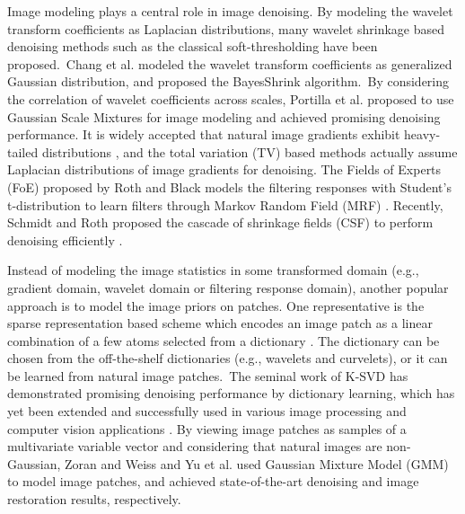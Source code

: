 Image modeling plays a central role in image denoising. By modeling the wavelet transform coefficients as Laplacian distributions, many wavelet shrinkage based denoising methods such as the classical soft-thresholding \cite{softthresholding} have been proposed.\ Chang et al. modeled the wavelet transform coefficients as generalized Gaussian distribution, and proposed the BayesShrink \cite{bayesshrink} algorithm.\ By considering the correlation of wavelet coefficients across scales, Portilla et al.  \cite{blsgsm} proposed to use Gaussian Scale Mixtures for image modeling and achieved promising denoising performance. It is widely accepted that natural image gradients exhibit heavy-tailed distributions \cite{weiss}, and the total variation (TV) based methods \cite{rudin1992nonlinear,osher2005iterative} actually assume Laplacian distributions of image gradients for denoising. The Fields of Experts (FoE) \cite{foe} proposed by Roth and Black models the filtering responses with Student's t-distribution to learn filters through Markov Random Field (MRF) \cite{Bishop}. Recently, Schmidt and Roth proposed the cascade of shrinkage fields (CSF) to perform denoising efficiently \cite{csf}.

Instead of modeling the image statistics in some transformed domain (e.g., gradient domain, wavelet domain or filtering response domain), another popular approach is to model the image priors on patches. One representative is the sparse representation based scheme which encodes an image patch as a linear combination of a few atoms selected from a dictionary \cite{olshausen1996emergence,olshausen1997sparse,ksvd}. The dictionary can be chosen from the off-the-shelf dictionaries (e.g., wavelets and curvelets), or it can be learned from natural image patches.\ The seminal work of K-SVD \cite{ksvdtsp,ksvd} has demonstrated promising denoising performance by dictionary learning, which has yet been extended and successfully used in various image processing and computer vision applications \cite{srcolor,srcvpr,lcksvd}. By viewing image patches as samples of a multivariate variable vector and considering that natural images are non-Gaussian, Zoran and Weiss \cite{epll,gmmnips} and Yu et al.  \cite{ple} used Gaussian Mixture Model (GMM) to model image patches, and achieved state-of-the-art denoising and image restoration results, respectively.

